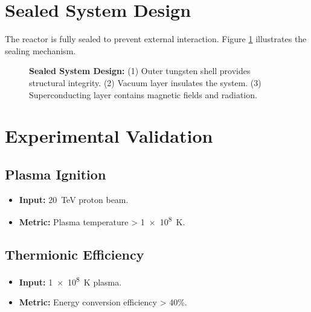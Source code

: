 \documentclass[12pt, a4paper]{article}
\begin{document}
\section{Sealed System Design}
The reactor is fully sealed to prevent external interaction. Figure \ref{fig:sealed_system} illustrates the sealing mechanism.

\begin{figure}[H]
\centering
{}
\caption{
\textbf{Sealed System Design:} 
(1) Outer tungsten shell provides structural integrity. 
(2) Vacuum layer insulates the system. 
(3) Superconducting layer contains magnetic fields and radiation.
}
\label{fig:sealed_system}
\end{figure}

\section{Experimental Validation}
\subsection{Plasma Ignition}
\begin{itemize}
\item \textbf{Input:} \SI{20}{TeV} proton beam.
\item \textbf{Metric:} Plasma temperature > \SI{1e8}{K}.
\end{itemize}

\subsection{Thermionic Efficiency}
\begin{itemize}
\item \textbf{Input:} \SI{1e8}{K} plasma.
\item \textbf{Metric:} Energy conversion efficiency > 40\%.
\end{itemize}
\end{document}
